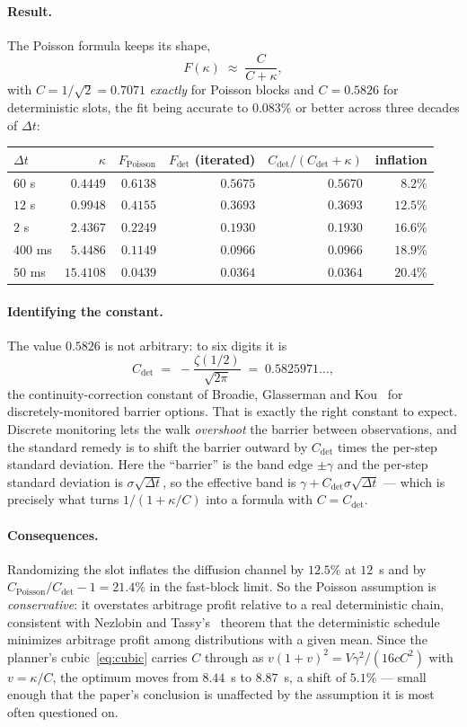 \documentclass[11pt]{article}
\theoremstyle{definition}
\theoremstyle{remark}
\newcommand{\dt}{\Delta t}
\newcommand{\1}{\mathbf{1}}
\begin{document}
\paragraph{Result.} The Poisson formula keeps its shape,
\[
F(\kappa) \;\approx\; \frac{C}{C+\kappa},
\]
with $C = 1/\sqrt2 = 0.7071$ \emph{exactly} for Poisson blocks and $C = 0.5826$ for deterministic slots, the fit being accurate to $0.083\%$ or better across three decades of $\dt$:
\begin{center}
\begin{tabular}{lrrrrr}
\toprule
$\dt$ & $\kappa$ & $F_{\text{Poisson}}$ & $F_{\det}$ (iterated) & $C_{\det}/(C_{\det}+\kappa)$ & inflation \\
\midrule
$60$ s   & $0.4449$  & $0.6138$ & $0.5675$ & $0.5670$ & $8.2\%$ \\
$12$ s   & $0.9948$  & $0.4155$ & $0.3693$ & $0.3693$ & $12.5\%$ \\
$2$ s    & $2.4367$  & $0.2249$ & $0.1930$ & $0.1930$ & $16.6\%$ \\
$400$ ms & $5.4486$  & $0.1149$ & $0.0966$ & $0.0966$ & $18.9\%$ \\
$50$ ms  & $15.4108$ & $0.0439$ & $0.0364$ & $0.0364$ & $20.4\%$ \\
\bottomrule
\end{tabular}
\end{center}

\paragraph{Identifying the constant.} The value $0.5826$ is not arbitrary: to six digits it is
\[
C_{\det} \;=\; -\frac{\zeta(1/2)}{\sqrt{2\pi}} \;=\; 0.5825971\ldots,
\]
the continuity-correction constant of Broadie, Glasserman and Kou~\cite{broadie1997continuity} for discretely-monitored barrier options. That is exactly the right constant to expect. Discrete monitoring lets the walk \emph{overshoot} the barrier between observations, and the standard remedy is to shift the barrier outward by $C_{\det}$ times the per-step standard deviation. Here the ``barrier'' is the band edge $\pm\gamma$ and the per-step standard deviation is $\sigma\sqrt{\dt}$, so the effective band is $\gamma + C_{\det}\sigma\sqrt{\dt}$ --- which is precisely what turns $1/(1+\kappa/C)$ into a formula with $C = C_{\det}$.

\paragraph{Consequences.} Randomizing the slot inflates the diffusion channel by $12.5\%$ at $12$~s and by $C_{\text{Poisson}}/C_{\det} - 1 = 21.4\%$ in the fast-block limit. So the Poisson assumption is \emph{conservative}: it overstates arbitrage profit relative to a real deterministic chain, consistent with Nezlobin and Tassy's~\cite{nezlobin2025lvr} theorem that the deterministic schedule minimizes arbitrage profit among distributions with a given mean. Since the planner's cubic~\eqref{eq:cubic} carries $C$ through as $v(1+v)^2 = V\gamma^2/(16cC^2)$ with $v = \kappa/C$, the optimum moves from $8.44$~s to $8.87$~s, a shift of $5.1\%$ --- small enough that the paper's conclusion is unaffected by the assumption it is most often questioned on.
\end{document}
